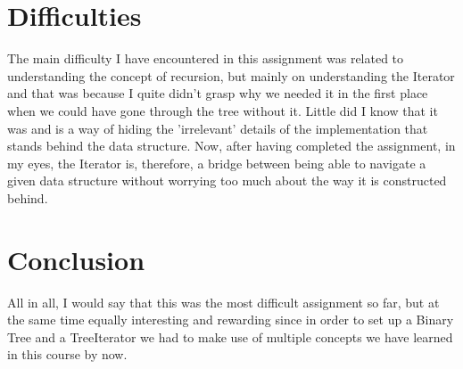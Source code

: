 \documentclass[a4paper,11pt]{article}
\begin{document}
\section*{Difficulties}

The main difficulty I have encountered in this assignment was related to understanding the concept of recursion, but mainly on understanding the Iterator and that was because I quite didn't grasp why we needed it in the first place when we could have gone through the tree without it. Little did I know that it was and is a way of hiding the 'irrelevant' details of the implementation that stands behind the data structure. Now, after having completed the assignment, in my eyes, the Iterator is, therefore, a bridge between being able to navigate a given data structure without worrying too much about the way it is constructed behind.  

\section*{Conclusion}

All in all, I would say that this was the most difficult assignment so far, but at the same time equally interesting and rewarding since in order to set up a Binary Tree and a TreeIterator we had to make use of multiple concepts we have learned in this course by now.
\end{document}
